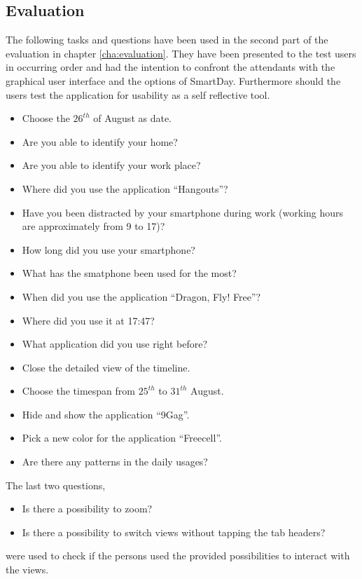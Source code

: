 \documentclass[final,twoside,11pt,titlepage,a4paper,english,bibliography=totocnumbered,listof=numbered]{scrbook}
\begin{document}
\begin{appendix} 

\addappheadtotoc

\chapter{Evaluation}
\label{cha:appendixEva}
The following tasks and questions have been used in the second part of the evaluation in chapter \ref{cha:evaluation}. They have been presented to the test users in occurring order and had the intention to confront the attendants with the graphical user interface and the options of SmartDay. Furthermore should the users test the application for usability as a self reflective tool.
\begin{itemize}
\item Choose the $26^{th}$ of August as date.
\item Are you able to identify your home?
\item Are you able to identify your work place?
\item Where did you use the application ``Hangouts''?
\item Have you been distracted by your smartphone during work (working hours are approximately from 9 to 17)?
\item How long did you use your smartphone?
\item What has the smatphone been used for the most?
\item When did you use the application ``Dragon, Fly! Free''?
\item Where did you use it at 17:47?
\item What application did you use right before?
\item Close the detailed view of the timeline.
\item Choose the timespan from $25^{th}$ to $31^{th}$ August.
\item Hide and show the application ``9Gag''.
\item Pick a new color for the application ``Freecell''.
\item Are there any patterns in the daily usages?
\end{itemize}
 The last two questions,
\begin{itemize}
\item Is there a possibility to zoom?
\item Is there a possibility to switch views without tapping the tab headers?
\end{itemize}
were used to check if the persons used the provided possibilities to interact with the views.


\end{appendix}
\end{document}
